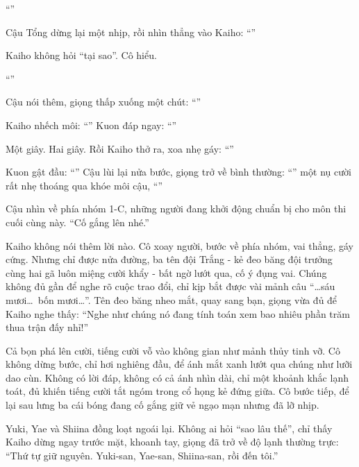 \documentclass[../main.tex]{subfiles}
\begin{document}
``''

Cậu Tổng dừng lại một nhịp, rồi nhìn thẳng vào Kaiho: ``''

Kaiho không hỏi ``tại sao''. Cô hiểu.

``''

Cậu nói thêm, giọng thấp xuống một chút: ``''

Kaiho nhếch môi: ``'' Kuon đáp ngay: ``''

Một giây. Hai giây. Rồi Kaiho thở ra, xoa nhẹ gáy: ``''

Kuon gật đầu: ``'' Cậu lùi lại nửa bước, giọng trở về bình thường: ``'' một nụ cười rất nhẹ thoáng qua khóe môi cậu, ``''

Cậu nhìn về phía nhóm 1-C, những người đang khởi động chuẩn bị cho môn thi cuối cùng này. ``Cố gắng lên nhé.''

Kaiho không nói thêm lời nào. Cô xoay người, bước về phía nhóm, vai thẳng, gáy cứng. Nhưng chỉ được nửa đường, ba tên đội Trắng - kẻ đeo băng đội trưởng cùng hai gã luôn miệng cười khẩy - bất ngờ lướt qua, cố ý đụng vai. Chúng không đủ gần để nghe rõ cuộc trao đổi, chỉ kịp bắt được vài mảnh câu ``\dots sáu mươi\dots\ bốn mươi\dots''. Tên đeo băng nheo mắt, quay sang bạn, giọng vừa đủ để Kaiho nghe thấy: ``Nghe như chúng nó đang tính toán xem bao nhiêu phần trăm thua trận đấy nhỉ!''

Cả bọn phá lên cười, tiếng cười vỗ vào không gian như mảnh thủy tinh vỡ. Cô không dừng bước, chỉ hơi nghiêng đầu, để ánh mắt xanh lướt qua chúng như lưỡi dao cùn. Không có lời đáp, không có cả ánh nhìn dài, chỉ một khoảnh khắc lạnh toát, đủ khiến tiếng cười tắt ngóm trong cổ họng kẻ đứng giữa. Cô bước tiếp, để lại sau lưng ba cái bóng đang cố gắng giữ vẻ ngạo mạn nhưng đã lỡ nhịp.

Yuki, Yae và Shiina đồng loạt ngoái lại. Không ai hỏi ``sao lâu thế'', chỉ thấy Kaiho dừng ngay trước mặt, khoanh tay, giọng đã trở về độ lạnh thường trực: ``Thứ tự giữ nguyên. Yuki-san, Yae-san, Shiina-san, rồi đến tôi.''
\end{document}
